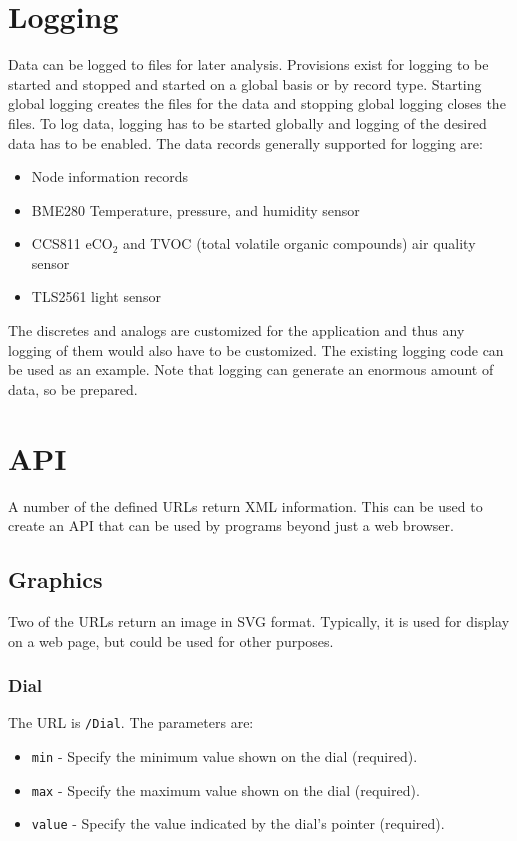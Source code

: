 \documentclass[10pt, openany, draft]{article}
\begin{document}
\section{Logging}
Data can be logged to files for later analysis.  Provisions exist for logging to be started and stopped and started on a global basis or by record type.  Starting global logging creates the files for the data and stopping global logging closes the files.  To log data, logging has to be started globally and logging of the desired data has to be enabled.  The data records generally supported for logging are:
\begin{itemize}
  \item Node information records
  \item BME280 Temperature, pressure, and humidity sensor
  \item CCS811 eCO$_2$ and TVOC (total volatile organic compounds) air quality sensor
  \item TLS2561 light sensor
\end{itemize}
The discretes and analogs are customized for the application and thus any logging of them would also have to be customized.  The existing logging code can be used as an example.  Note that logging can generate an enormous amount of data, so be prepared.
\section{API}
A number of the defined URLs return XML information.  This can be used to create an API that can be used by programs beyond just a web browser.

\subsection{Graphics}
Two of the URLs return an image in SVG format.  Typically, it is used for display on a web page, but could be used for other purposes.

\subsubsection{Dial}
The URL is \texttt{/Dial}.  The parameters are:
\begin{itemize}
  \item \texttt{min} - Specify the minimum value shown on the dial (required).
  \item \texttt{max} - Specify the maximum value shown on the dial (required).
  \item \texttt{value} - Specify the value indicated by the dial's pointer (required).
\end{itemize}
\end{document}
